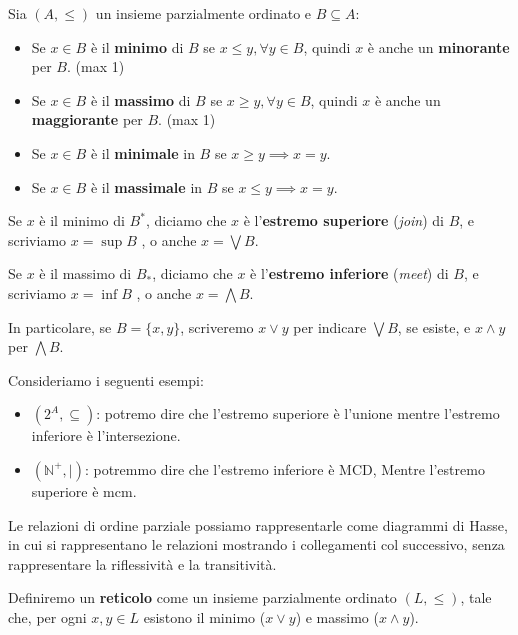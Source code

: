 \begin{definizione}
    Sia $(A,\leq)$ un insieme parzialmente ordinato e $B \subseteq A$:
    \begin{itemize}
        \item Se $x \in B$ è il \textbf{minimo} di $B$ se $x \leq y, \forall y
                  \in B$, quindi $x$ è anche un \textbf{minorante} per $B$. (max 1)
        \item Se $x \in B$ è il \textbf{massimo} di $B$ se $x \geq y,\forall y
                  \in B$, quindi $x$ è anche un \textbf{maggiorante} per $B$. (max 1)
        \item Se $x \in B$ è il \textbf{minimale} in $B$ se $x \geq y \implies
                  x = y$.
        \item Se $x \in B$ è il \textbf{massimale} in $B$ se $x \leq y \implies
                  x = y$.
    \end{itemize}
\end{definizione}
\begin{definizione}
    Se $x$ è il minimo di $B^\ast$, diciamo che $x$ è l'\textbf{estremo superiore}
    (\textit{join}) di $B$, e scriviamo $x = \sup B$ , o anche $x = \bigvee B$.

    Se $x$ è il massimo di $B_\ast$, diciamo che $x$ è l'\textbf{estremo inferiore}
    (\textit{meet}) di $B$, e scriviamo $x = \inf B$ , o anche $x = \bigwedge B$.

    In particolare, se $B = \{x, y\}$, scriveremo $x \lor y$ per indicare $\bigvee
        B$, se esiste, e $x \land y$ per $\bigwedge B$.
\end{definizione}
\begin{esempio}
    Consideriamo i seguenti esempi:
    \begin{itemize}
        \item $(2^A, \subseteq)$: potremo dire che l'estremo superiore è l'unione
              mentre l'estremo inferiore è l'intersezione.
        \item $(\mathbb{N}^+,|)$: potremmo dire che l'estremo inferiore è MCD, Mentre
              l'estremo superiore è mcm.
    \end{itemize}
\end{esempio}
Le relazioni di ordine parziale possiamo rappresentarle come diagrammi di Hasse,
in cui si rappresentano le relazioni mostrando i collegamenti col successivo,
senza rappresentare la riflessività e la transitività.
\begin{definizione}
    Definiremo un \textbf{reticolo} come un insieme parzialmente ordinato $(L,
        \leq)$, tale che, per ogni $x,y\in L$ esistono il minimo ($x \lor y$) e
    massimo ($x \land y$).
\end{definizione}
